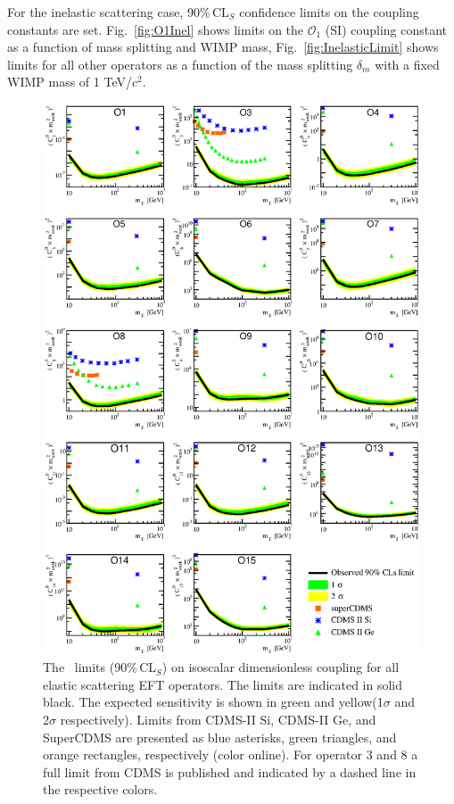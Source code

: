 For the inelastic scattering case, 90\%\,CL$_S$ confidence limits on the coupling constants are set. Fig.~\ref{fig:O1Inel} shows limits on the $\mathcal{O}_1$ (SI) coupling constant as a function of mass splitting and WIMP mass, Fig.~\ref{fig:InelasticLimit} shows limits for all other operators as a function of the mass splitting $\delta_m$ with a fixed WIMP mass of 1 TeV/$c^2$.  

\begin{figure}
\begin{minipage}{1.\linewidth}{}
\centerline{\includegraphics[width=\textwidth,height=0.99\textheight,keepaspectratio]{Figures/ElasticAllLimitCDMS.eps}}
\end{minipage}
\caption{The \Xehund\ limits (90\%\,CL$_S$) on isoscalar dimensionless coupling for all elastic scattering EFT operators. The limits are indicated in solid black. The expected sensitivity is shown in green and yellow(1$\sigma$ and 2$\sigma$ respectively). Limits from CDMS-II Si, CDMS-II Ge, and SuperCDMS \cite{CDMSEFT} are presented as blue asterisks, green triangles, and orange rectangles, respectively (color online). For operator 3 and 8 a full limit from CDMS is published and indicated by a dashed line in the respective colors.}
\label{fig:elasticLimit}
\end{figure}

